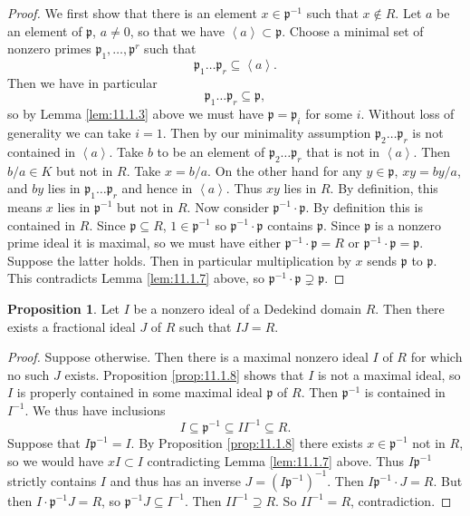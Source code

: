 \documentclass{article}
\newcommand{\rb}[1]{\left( #1 \right)}
\newcommand{\ab}[1]{\left\langle #1 \right\rangle}
\theoremstyle{definition}\newtheorem{definition}{Definition}[subsection]
\theoremstyle{definition}\newtheorem{remark}[definition]{Remark}
\theoremstyle{definition}\newtheorem*{example}{Example}
\theoremstyle{definition}\newtheorem*{note}{Note}
\newtheorem{proposition}[definition]{Proposition}
\begin{document}
\begin{proof}
We first show that there is an element $ x \in \mathfrak{p}^{-1} $ such that $ x \notin R $. Let $ a $ be an element of $ \mathfrak{p} $, $ a \ne 0 $, so that we have $ \ab{a} \subset \mathfrak{p} $. Choose a minimal set of nonzero primes $ \mathfrak{p}_1, \dots, \mathfrak{p}^r $ such that
$$ \mathfrak{p}_1 \dots \mathfrak{p}_r \subseteq \ab{a}. $$
Then we have in particular
$$ \mathfrak{p}_1 \dots \mathfrak{p}_r \subseteq \mathfrak{p}, $$
so by Lemma \ref{lem:11.1.3} above we must have $ \mathfrak{p} = \mathfrak{p}_i $ for some $ i $. Without loss of generality we can take $ i = 1 $. Then by our minimality assumption $ \mathfrak{p}_2 \dots \mathfrak{p}_r $ is not contained in $ \ab{a} $. Take $ b $ to be an element of $ \mathfrak{p}_2 \dots \mathfrak{p}_r $ that is not in $ \ab{a} $. Then $ b / a \in K $ but not in $ R $. Take $ x = b / a $. On the other hand for any $ y \in \mathfrak{p} $, $ xy = by / a $, and $ by $ lies in $ \mathfrak{p}_1 \dots \mathfrak{p}_r $ and hence in $ \ab{a} $. Thus $ xy $ lies in $ R $. By definition, this means $ x $ lies in $ \mathfrak{p}^{-1} $ but not in $ R $. Now consider $ \mathfrak{p}^{-1} \cdot \mathfrak{p} $. By definition this is contained in $ R $. Since $ \mathfrak{p} \subseteq R $, $ 1 \in \mathfrak{p}^{-1} $ so $ \mathfrak{p}^{-1} \cdot \mathfrak{p} $ contains $ \mathfrak{p} $. Since $ \mathfrak{p} $ is a nonzero prime ideal it is maximal, so we must have either $ \mathfrak{p}^{-1} \cdot \mathfrak{p} = R $ or $ \mathfrak{p}^{-1} \cdot \mathfrak{p} = \mathfrak{p} $. Suppose the latter holds. Then in particular multiplication by $ x $ sends $ \mathfrak{p} $ to $ \mathfrak{p} $. This contradicts Lemma \ref{lem:11.1.7} above, so $ \mathfrak{p}^{-1} \cdot \mathfrak{p} \supsetneq \mathfrak{p} $.
\end{proof}

\begin{proposition}
\label{prop:11.1.9}
Let $ I $ be a nonzero ideal of a Dedekind domain $ R $. Then there exists a fractional ideal $ J $ of $ R $ such that $ IJ = R $.
\end{proposition}

\begin{proof}
Suppose otherwise. Then there is a maximal nonzero ideal $ I $ of $ R $ for which no such $ J $ exists. Proposition \ref{prop:11.1.8} shows that $ I $ is not a maximal ideal, so $ I $ is properly contained in some maximal ideal $ \mathfrak{p} $ of $ R $. Then $ \mathfrak{p}^{-1} $ is contained in $ I^{-1} $. We thus have inclusions
$$ I \subseteq \mathfrak{p}^{-1} \subseteq II^{-1} \subseteq R. $$
Suppose that $ I\mathfrak{p}^{-1} = I $. By Proposition \ref{prop:11.1.8} there exists $ x \in \mathfrak{p}^{-1} $ not in $ R $, so we would have $ xI \subset I $ contradicting Lemma \ref{lem:11.1.7} above. Thus $ I\mathfrak{p}^{-1} $ strictly contains $ I $ and thus has an inverse $ J = \rb{I\mathfrak{p}^{-1}}^{-1} $. Then $ I\mathfrak{p}^{-1} \cdot J = R $. But then $ I \cdot \mathfrak{p}^{-1}J = R $, so $ \mathfrak{p}^{-1}J \subseteq I^{-1} $. Then $ II^{-1} \supseteq R $. So $ II^{-1} = R $, contradiction.
\end{proof}
\end{document}
